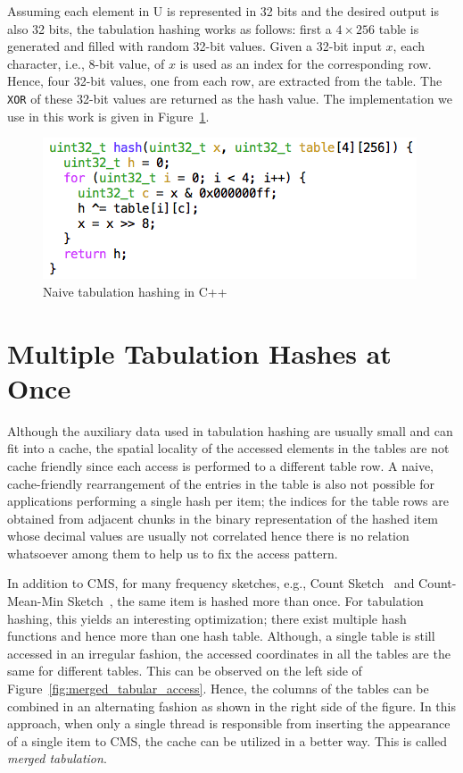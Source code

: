\documentclass[10pt, conference, compsocconf]{IEEEtran}
\begin{document}
Assuming each element in {\cal U} is represented in 32 bits and the desired output is also 32 bits, the tabulation hashing works as follows: first a $4 \times 256$ table is generated and filled with random 32-bit values. Given a 32-bit input $x$, each character, i.e., 8-bit value, of $x$ is used as an index for the corresponding row. Hence, four 32-bit values, one from each row, are extracted from the table. The {\tt XOR} of these 32-bit values are returned as the hash value. The implementation we use in this work is given in Figure~\ref{fig:tabulation_seq}.

\begin{figure}[htbp]
\begin{center}
\includegraphics[width=0.90\linewidth]{tabular_code.png}
\caption{Naive tabulation hashing in C++}
\label{fig:tabulation_seq}
\end{center}
\end{figure}

\section{Multiple Tabulation Hashes at Once}\label{sec:tab}

Although the auxiliary data used in tabulation hashing are usually small and can fit into a cache, the spatial locality of the accessed elements in the tables are not cache friendly since each access is performed to a different table row. A naive, cache-friendly rearrangement of the entries in the table is also not possible for applications performing a single hash per item; the indices for the table rows are obtained from adjacent chunks in the binary representation of the hashed item whose decimal values are usually not correlated hence there is no relation whatsoever among them to help us to fix the access pattern.

In addition to CMS, for many frequency sketches, e.g., Count Sketch~\cite{charikar2002} and Count-Mean-Min Sketch~\cite{Goyal2012}, the same item is hashed more than once. For tabulation hashing, this yields an interesting optimization; there exist multiple hash functions and hence more than one hash table. Although, a single table is still accessed in an irregular fashion, the accessed coordinates in all the tables are the same for different tables. This can be observed on the left side of Figure~\ref{fig:merged_tabular_access}. Hence, the columns of the tables can be combined in an alternating fashion as shown in the right side of the figure. In this approach, when only a single thread is responsible from inserting the appearance of a single item to CMS, the cache can be utilized in a better way. This is called {\em merged tabulation}.
\end{document}
